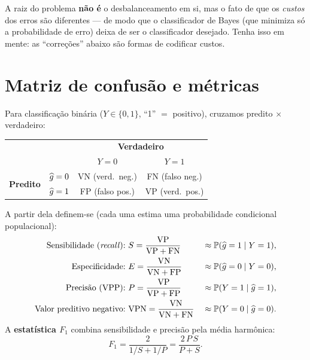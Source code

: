 \documentclass[11pt,a4paper]{article}
\begin{document}
\begin{atencao}
A raiz do problema \textbf{não é} o desbalanceamento em si, mas o fato de que os
\emph{custos} dos erros são diferentes --- de modo que o classificador de Bayes
(que minimiza só a probabilidade de erro) deixa de ser o classificador desejado.
Tenha isso em mente: as ``correções'' abaixo são formas de codificar custos.
\end{atencao}

\section{Matriz de confusão e métricas}
Para classificação binária ($Y\in\{0,1\}$, ``1'' $=$ positivo), cruzamos predito
$\times$ verdadeiro:
\begin{center}\small
\renewcommand{\arraystretch}{1.3}
\begin{tabular}{@{}ll cc@{}}
\toprule
 & & \multicolumn{2}{c}{\textbf{Verdadeiro}} \\
 & & $Y=0$ & $Y=1$ \\
\midrule
\multirow{2}{*}{\textbf{Predito}} & $\widehat{g}=0$ & VN (verd.\ neg.) & FN (falso neg.) \\
                                  & $\widehat{g}=1$ & FP (falso pos.) & VP (verd.\ pos.) \\
\bottomrule
\end{tabular}
\end{center}
A partir dela definem-se (cada uma estima uma probabilidade condicional
populacional):
\begin{align*}
  \text{Sensibilidade (\emph{recall}):}\ & S=\frac{\text{VP}}{\text{VP}+\text{FN}}
    && \approx \mathbb{P}(\widehat{g}=1\mid Y=1),\\
  \text{Especificidade:}\ & E=\frac{\text{VN}}{\text{VN}+\text{FP}}
    && \approx \mathbb{P}(\widehat{g}=0\mid Y=0),\\
  \text{Precisão (VPP):}\ & P=\frac{\text{VP}}{\text{VP}+\text{FP}}
    && \approx \mathbb{P}(Y=1\mid \widehat{g}=1),\\
  \text{Valor preditivo negativo:}\ & \text{VPN}=\frac{\text{VN}}{\text{VN}+\text{FN}}
    && \approx \mathbb{P}(Y=0\mid \widehat{g}=0).
\end{align*}
A \textbf{estatística $F_1$} combina sensibilidade e precisão pela média harmônica:
\begin{equation}\label{eq:f1}
  F_1 = \frac{2}{1/S + 1/P} = \frac{2\,P\,S}{P+S}.
\end{equation}
\end{document}
